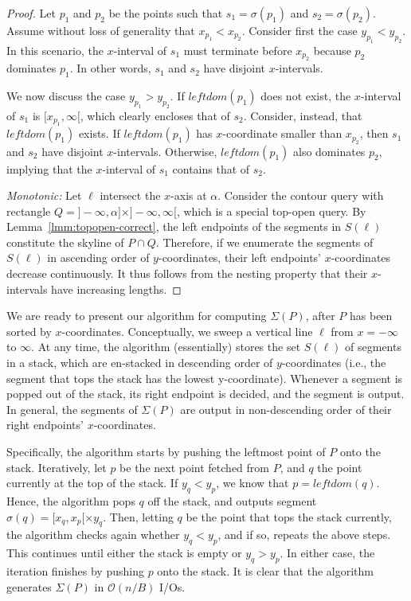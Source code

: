 \documentclass{sig-alternate}
\DeclareMathOperator*{\intr}{\cap}
\def\extraspacing{\vspace{2mm} \noindent}
\def\leftdom{\mathit{leftdom}}
\def\intr{\cap}
\newcommand{\bigO}{\mathcal{O}}
\renewcommand{\(}{\left(}
\renewcommand{\)}{\right)}
\begin{document}
\begin{fullenv}
\begin{proof}
  \extraspacing {\em Nesting:} Let $p_1$ and $p_2$ be the points such that $s_1
  = \sigma(p_1)$ and $s_2 = \sigma(p_2)$. Assume without loss of generality
  that $x_{p_1} < x_{p_2}$. Consider first the case $y_{p_1} < y_{p_2}$. In
  this scenario, the $x$-interval of $s_1$ must terminate before $x_{p_2}$
  because $p_2$ dominates $p_1$. In other words, $s_1$ and $s_2$ have disjoint
  $x$-intervals.

  We now discuss the case $y_{p_1} > y_{p_2}$. If $\leftdom(p_1)$ does not
  exist, the $x$-interval of $s_1$ is $[x_{p_1}, \infty[$, which clearly
  encloses that of $s_2$. Consider, instead, that $\leftdom(p_1)$ exists.  If
  $\leftdom(p_1)$ has $x$-coordinate smaller than $x_{p_2}$, then $s_1$ and $s_2$
  have disjoint $x$-intervals.  Otherwise, $\leftdom(p_1)$ also dominates
  $p_2$, implying that the $x$-interval of $s_1$ contains that of $s_2$.

  \vspace{2mm} {\em Monotonic:} Let $\ell$ intersect the $x$-axis at $\alpha$.
  Consider the contour query with rectangle $Q = ]-\infty, \alpha] \times
  ]-\infty, \infty[$, which is a special top-open query. By
  Lemma~\ref{lmm:topopen-correct}, the left endpoints of the segments in
  $S(\ell)$ constitute the skyline of $P \intr Q$. Therefore, if we enumerate
  the segments of $S(\ell)$ in ascending order of $y$-coordinates, their left
  endpoints' $x$-coordinates decrease continuously. It thus follows from the
  nesting property that their $x$-intervals have increasing lengths.
\end{proof}
\end{fullenv}

We are ready to present our algorithm for computing $\Sigma(P)$, after $P$ has been sorted by $x$-coordinates. Conceptually, we sweep a vertical line $\ell$ from $x = -\infty$ to $\infty$. At any time, the algorithm (essentially) stores the set $S(\ell)$ of segments in a stack, which are en-stacked in descending order of $y$-coordinates (i.e., the segment that tops the stack has the lowest y-coordinate). Whenever a segment is popped out of the stack, its right endpoint is decided, and the segment is output. In general, the segments of $\Sigma(P)$ are output in non-descending order of their right endpoints' $x$-coordinates.

Specifically, the algorithm starts by pushing the leftmost
point of $P$ onto the stack. Iteratively, let $p$ be the next point fetched
from $P$, and $q$ the point currently at the top of the stack. If $y_q < y_p$, we know that $p = \leftdom(q)$. Hence, the algorithm pops
$q$ off the stack, and outputs segment $\sigma(q) = [x_q, x_p[ \times y_q$.
Then, letting $q$ be the point that tops the stack currently, the algorithm
checks again whether $y_q < y_p$, and if so, repeats the above steps. This
continues until either the stack is empty or $y_q > y_p$. In either case, the
iteration finishes by pushing $p$ onto the stack. It is clear that the algorithm generates $\Sigma(P)$ in $\bigO(n/B)$ I/Os.
\end{document}
